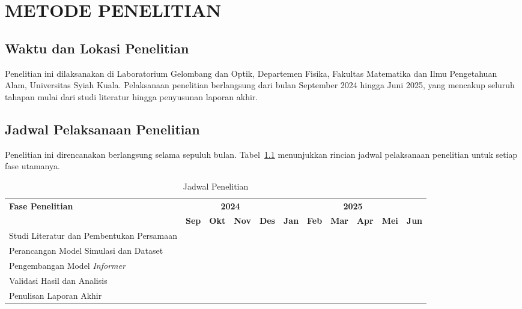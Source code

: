 \chapter{METODE PENELITIAN}

\section{Waktu dan Lokasi Penelitian}
Penelitian ini dilaksanakan di Laboratorium Gelombang dan Optik, Departemen Fisika, Fakultas Matematika dan Ilmu Pengetahuan Alam, Universitas Syiah Kuala. Pelaksanaan penelitian berlangsung dari bulan September 2024 hingga Juni 2025, yang mencakup seluruh tahapan mulai dari studi literatur hingga penyusunan laporan akhir.

\section{Jadwal Pelaksanaan Penelitian}
Penelitian ini direncanakan berlangsung selama sepuluh bulan. Tabel~\ref{tab:jadwal_penelitian} menunjukkan rincian jadwal pelaksanaan penelitian untuk setiap fase utamanya.

\begin{table}[H]
  \centering
  \caption{Jadwal Penelitian}
  \label{tab:jadwal_penelitian}
  \small
  \begin{tabularx}{\textwidth}{X *{10}{c}}
    \toprule
    \textbf{Fase Penelitian} & \multicolumn{4}{c}{\textbf{2024}} & \multicolumn{6}{c}{\textbf{2025}} \\
    \cmidrule(lr){2-5} \cmidrule(lr){6-11}
    & \textbf{Sep} & \textbf{Okt} & \textbf{Nov} & \textbf{Des} & \textbf{Jan} & \textbf{Feb} & \textbf{Mar} & \textbf{Apr} & \textbf{Mei} & \textbf{Jun} \\
    \midrule
    Studi Literatur dan Pembentukan Persamaan & \cellcolor{gray!20} & \cellcolor{gray!20} & & & & & & & & \\
    Perancangan Model Simulasi dan Dataset & & & \cellcolor{gray!20} & \cellcolor{gray!20} & & & & & & \\
    Pengembangan Model \textit{Informer} & & & & & \cellcolor{gray!20} & \cellcolor{gray!20} & \cellcolor{gray!20} & & & \\
    Validasi Hasil dan Analisis & & & & & & & & \cellcolor{gray!20} & \cellcolor{gray!20} & \\
    Penulisan Laporan Akhir & & & & & & & & & \cellcolor{gray!20} & \cellcolor{gray!20} \\
    \bottomrule
  \end{tabularx}
\end{table}

